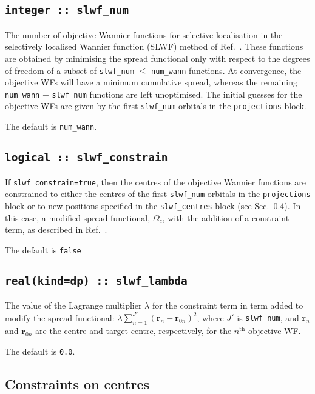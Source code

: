 \subsection[slwf\_num]{\tt integer :: slwf\_num}
The number of objective Wannier functions for selective localisation in the selectively localised Wannier function (SLWF) method of Ref.~\cite{Marianetti}. These functions are obtained by minimising the spread functional only with respect to the degrees of freedom of a subset of {\tt slwf\_num} $\le$ {\tt num\_wann} functions. At convergence, the objective WFs will have a minimum cumulative spread, whereas the remaining {\tt num\_wann} $-$ {\tt slwf\_num} functions are left unoptimised. The initial guesses for the objective WFs are given by the first {\tt slwf\_num} orbitals in the {\tt projections} block. 

The default is {\tt num\_wann}.

\subsection[slwf\_constrain]{\tt logical :: slwf\_constrain}
If {\tt slwf\_constrain=true}, then the centres of the objective Wannier functions are constrained to either the centres of the first {\tt slwf\_num} orbitals in the {\tt projections} block or to new positions specified in the {\tt slwf\_centres} block (see Sec.~\ref{sec:centre_constraints}). In this case, a modified spread functional, $\Omega_c$, with the addition of a constraint term, as described in Ref.~\cite{Marianetti}.

The default is {\tt false}

\subsection[slwf\_lambda]{\tt real(kind=dp) :: slwf\_lambda}
The value of the Lagrange multiplier $\lambda$ for the constraint term in term added to modify the spread functional: $ \lambda \sum_{n=1}^{J'} \left(\overline{\mathbf{r}}_n - \mathbf{r}_{0n}\right)^2$, where $J'$ is {\tt slwf\_num}, and $\overline{\mathbf{r}}_{n}$ and $\mathbf{r}_{0n}$ are the centre and target centre, respectively, for the $n^{\text{th}}$ objective WF. 

The default is {\tt 0.0}.

\subsection{Constraints on centres}
\label{sec:centre_constraints}

